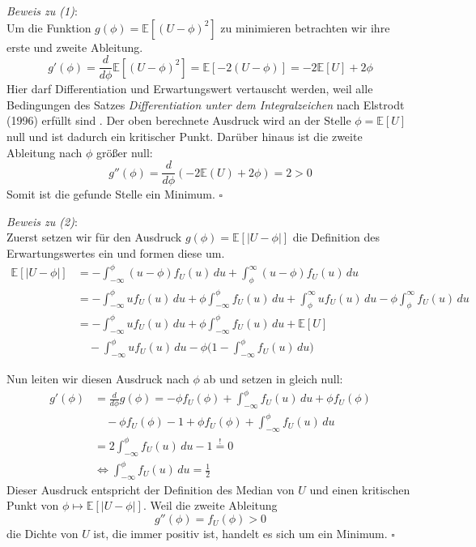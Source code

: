 \textit{Beweis zu (1)}: \\
Um die Funktion $g(\phi) = \mathbb{E}[(U - \phi)^2]$ zu minimieren betrachten wir ihre erste und zweite Ableitung.
$$ g'(\phi) = \frac{d}{d\phi}\mathbb{E}[(U-\phi)^2] = \mathbb{E}[-2(U-\phi)] = -2\mathbb{E}[U] + 2\phi$$
Hier darf Differentiation und Erwartungswert vertauscht werden, weil alle Bedingungen des Satzes \textit{Differentiation unter dem Integralzeichen}
nach Elstrodt (1996) erf\"ullt sind \cite[Kapitel 4, Satz 5.7]{elstrodt}.
Der oben berechnete Ausdruck wird an der Stelle $\phi = \mathbb{E}[U]$ null und ist dadurch ein kritischer Punkt. Dar\"uber hinaus ist die zweite
Ableitung nach $\phi$ gr\"o{\ss}er null:
$$g''(\phi) = \frac{d}{d\phi}(-2\mathbb{E}(U)+2\phi) = 2 > 0$$
Somit ist die gefunde Stelle ein Minimum. $\square$


\textit{Beweis zu (2)}: \\
Zuerst setzen wir f\"ur den Ausdruck $g(\phi) = \mathbb{E}[|U-\phi|]$ die Definition des Erwartungswertes ein und formen diese um.
\begin{equation*}
	\begin{split}
		\mathbb{E}[|U-\phi|]  & = -\int_{-\infty}^{\phi}(u-\phi)f_U(u)  \,du + \int_{\phi}^{\infty}(u-\phi)f_U(u)  \,du \\\
		& = - \int_{-\infty}^{\phi}uf_U(u)  \,du + \phi \int_{-\infty}^{\phi}f_U(u)  \,du + \int_{\phi}^{\infty}uf_U(u)  \,du -\phi \int_{\phi}^{\infty}f_U(u)  \,du \\\
		& = - \int_{-\infty}^{\phi}uf_U(u) \,du + \phi \int_{-\infty}^{\phi}f_U(u) \,du + \mathbb{E}[U] \\\
		& \quad - \int_{-\infty}^{\phi}uf_U(u) \,du - \phi \bigl(1 - \int_{-\infty}^{\phi}f_U(u) \,du \bigr)
	\end{split}
\end{equation*}

Nun leiten wir diesen Ausdruck nach $\phi$ ab und setzen in gleich null:
\begin{equation*}
	\begin{split}
		g'(\phi) & = \frac{d}{d\phi}g(\phi) = -\phi f_U(\phi) + \int_{-\infty}^{\phi}f_U(u) \,du + \phi f_U(\phi) \\\
		& \quad - \phi f_U(\phi) - 1 + \phi f_U(\phi) + \int_{-\infty}^{\phi}f_U(u) \,du \\\
		& = 2\int_{-\infty}^{\phi}f_U(u) \,du - 1 \overset{!}{=} 0 \\\
		& \Leftrightarrow \int_{-\infty}^{\phi}f_U(u) \,du = \frac{1}{2}
	\end{split}
\end{equation*}
Dieser Ausdruck entspricht der Definition des Median von $U$ und einen kritischen Punkt von $\phi \mapsto \mathbb{E}[|U - \phi|]$. Weil die zweite Ableitung
$$ g''(\phi) = f_U(\phi) > 0 $$
die Dichte von $U$ ist, die immer positiv ist, handelt es sich um ein Minimum. $\square$



